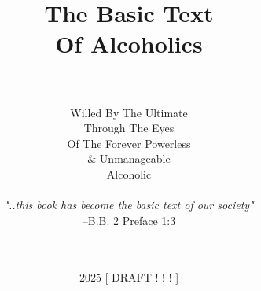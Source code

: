 \title{The Basic Text \\ \vspace*{1em} \Large Of Alcoholics}
\author{
    \hrulefill \\ \\
    Willed By The Ultimate \\
    Through The Eyes \\
    Of The Forever Powerless \\
    \& Unmanageable \\
    Alcoholic \\
    \\
    \emph{"..this book has become the basic text of our society"} \\
    --B.B. 2 Preface 1:3 \\
    \hrulefill \\ \\
}
\date{2025 [ DRAFT ! ! ! ]}
\newcommand{\logo}{symbol1.png}
\newcommand{\bbtitle}{The Basic Text \small Of Alcoholics}
\newcommand{\bbtitleshort}{The Basic Text}

\setstocksize{9in}{6in}%
\settrimmedsize{9in}{6in}{*}
\settrims{0in}{0in}

\setcolsepandrule{0.1875in}{0pt}

\settypeblocksize{*}{5.1125in}{*}  %

\checkandfixthelayout

\newcommand{\bbcontentsname}{%
    \headings Books of \bbtitleshort
}

\renewcommand{\textcopyright}{%
    {\fontfamily{DejaVuSerif-TLF}\selectfont ©}
}

\newcommand{\bbChapterPreamble}{%
    \bbHeading{Chapter-Book Preamble}
        Extract from Alcoholics Anonymous 2nd Ed., 
        \textcopyright A.A.W.S. Inc., 
        which is in the U.S. public domain.
        The text is used here for transformation into the verse form of a basic text 
        to facillitate verse based study and commentary.
}
